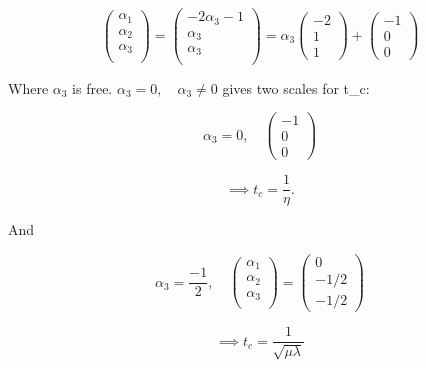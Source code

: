 \documentclass[12pt,twoside]{article}
\begin{document}
\begin{equation}
  \begin{pmatrix}
    \alpha_1 \\ \alpha_2 \\\alpha_3 \\
  \end{pmatrix}
  =
  \begin{pmatrix}
    -2\alpha_3-1 \\ \alpha_3 \\\alpha_3 \\
  \end{pmatrix}
  = \alpha_3
  \begin{pmatrix}
    -2 \\ 1 \\ 1
  \end{pmatrix}
  +
  \begin{pmatrix}
    -1 \\ 0 \\ 0
  \end{pmatrix}
\end{equation}

Where $\alpha_3$ is free. $\alpha_3=0, \quad \alpha_3\ne0$ gives two scales for
t\_c:

\begin{equation}
  \alpha_3=0, \quad
  \begin{pmatrix}
    -1 \\ 0 \\ 0
  \end{pmatrix}
\end{equation}

\begin{equation}
  \implies t_c = \frac{1}{\eta}.
\end{equation}

And

\begin{equation}
  \alpha_3 = \frac{-1}{2}, \quad
  \begin{pmatrix}
    \alpha_1 \\ \alpha_2 \\ \alpha_3 \\
  \end{pmatrix}
  =
  \begin{pmatrix}
    0 \\ -1/2 \\ -1/2
  \end{pmatrix}
\end{equation}

\begin{equation}
  \implies t_c = \frac{1}{\sqrt{\mu\lambda}}
\end{equation}
\end{document}
